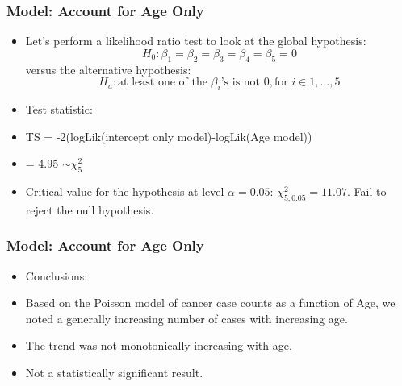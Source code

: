\documentclass[10pt,xcolor={svgnames},t]{beamer}
\begin{document}
%
\begin{frame}
	\frametitle{Model: Account for Age Only}
	
	\begin{itemize}
		\item Let's perform a likelihood ratio test to look at the global hypothesis:
		\[ H_0 : \beta_1 = \beta_2 = \beta_3 = \beta_4 =\beta_5 =0
		\]
		versus the alternative hypothesis:
		\[ H_a : \text{at least one of the } \beta_i \text{'s is not } 0, \text{for } i\in 1,\ldots,5
		\] 
				\bigskip
		\item Test statistic:
		\item[] TS = -2(logLik(intercept only model)-logLik(Age model))
		\item[] \quad \hskip7pt    = 4.95 $\sim \chi_5^2$
				\bigskip
		\item Critical value for the hypothesis at level $\alpha=0.05$: $\chi_{5,0.05}^2 = 11.07$. Fail to reject the null hypothesis.
	\end{itemize}
	
	
\end{frame}
%
%
\begin{frame}
	\frametitle{Model: Account for Age Only}
	
	\begin{itemize}
		\item[] Conclusions:
		\bigskip
		\item Based on the Poisson model of cancer case counts as a function of Age, we noted a generally increasing number of cases with increasing age.
		\bigskip
		\item The trend was not monotonically increasing with age.
		\bigskip
		\item Not a statistically significant result.
	\end{itemize}
	
	
\end{frame}
%
%
\end{document}
